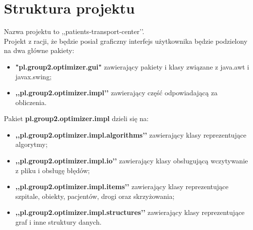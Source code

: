 \documentclass{article}
\begin{document}
\section{Struktura projektu}
{\fontsize{12}{12}\selectfont
Nazwa projektu to ,,patients-transport-center’’. \\
Projekt z racji, że będzie posiał graficzny interfejs użytkownika będzie podzielony na dwa główne pakiety: 
\begin{itemize}
    \item \textbf{"pl.group2.optimizer.gui"} zawierający pakiety i klasy związane z java.awt i javax.swing;
    \item \textbf{,,pl.group2.optimizer.impl’’} zawierający część odpowiadającą za obliczenia.
\end{itemize}

Pakiet \textbf{pl.group2.optimizer.impl} dzieli się na:
\begin{itemize}
    \item \textbf{,,pl.group2.optimizer.impl.algorithms’’} zawierający klasy reprezentujące algorytmy;
    \item \textbf{,,pl.group2.optimizer.impl.io’’} zawierający klasy obsługującą wczytywanie z pliku i obsługę błędów;
    \item \textbf{,,pl.group2.optimizer.impl.items’’} zawierający klasy reprezentujące szpitale, obiekty, pacjentów, drogi oraz skrzyżowania;
    \item \textbf{,,pl.group2.optimizer.impl.structures’’} zawierający klasy reprezentujące graf i inne struktury danych.
\end{itemize}

}

\clearpage
{}
\end{document}
